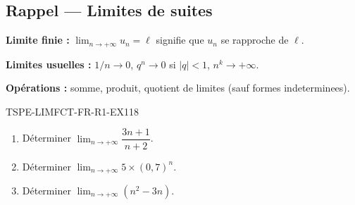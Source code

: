 

\subsection*{Rappel — Limites de suites}

\textbf{Limite finie :} $\lim_{n \to +\infty} u_n = \ell$ signifie que $u_n$ se rapproche de $\ell$.

\textbf{Limites usuelles :} $1/n \to 0$, $q^n \to 0$ si $|q| < 1$, $n^k \to +\infty$.

\textbf{Opérations :} somme, produit, quotient de limites (sauf formes indeterminees).

\begin{exercice}{TSPE-LIMFCT-FR-R1-EX1}{1}{8}
\begin{enumerate}
  \item Déterminer $\lim_{n \to +\infty} \dfrac{3n+1}{n+2}$.
  \item Déterminer $\lim_{n \to +\infty} 5 \times (0{,}7)^n$.
  \item Déterminer $\lim_{n \to +\infty} (n^2 - 3n)$.
\end{enumerate}
\end{exercice}

